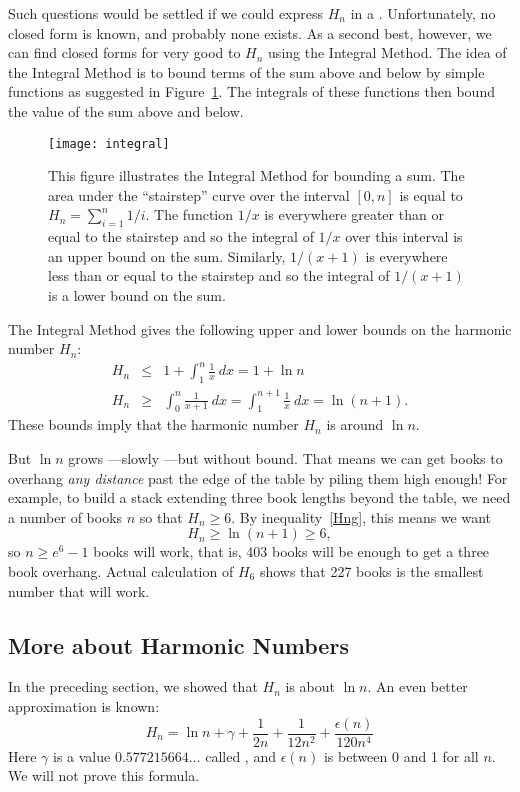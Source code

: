Such questions would be settled if we could express $H_n$ in a .  Unfortunately, no closed form is known, and probably none
exists.  As a second best, however, we can find closed forms for very good
 to $H_n$ using the Integral Method.  The idea of the
Integral Method is to bound terms of the sum above and below by simple
functions as suggested in Figure~\ref{fig:integral}.  The integrals of
these functions then bound the value of the sum above and below.

\begin{figure}[htbp]
\centerline{\texttt{[image: integral]}}
\caption{This figure illustrates the Integral Method for bounding
a sum.  The area under the ``stairstep'' curve over the interval $[0,
n]$ is equal to $H_n = \sum_{i=1}^n 1/i$.  The function $1/x$ is
everywhere greater than or equal to the stairstep and so the integral
of $1/x$ over this interval is an upper bound on the sum.  Similarly,
$1/(x+1)$ is everywhere less than or equal to the stairstep and so the
integral of $1/(x+1)$ is a lower bound on the sum.}
\label{fig:integral}
\end{figure}

The Integral Method gives the following upper and lower bounds on the
harmonic number $H_n$:
\begin{eqnarray}
H_n & \leq & 1 + \int_1^n \frac{1}{x} \ dx = 1 + \ln n \label{Hnl}\\
H_n & \geq & \int_0^n \frac{1}{x+1} \ dx = \int_1^{n+1} \frac{1}{x} \ dx = \ln(n+1).\label{Hng}
\end{eqnarray}
These bounds imply that the harmonic number $H_n$ is around $\ln n$.

But $\ln n$ grows ---slowly ---but without bound.  That means we can get
books to overhang \emph{any distance} past the edge of the table by piling
them high enough!  For example, to build a stack extending three book
lengths beyond the table, we need a number of books $n$ so that $H_n \ge
6$.  By inequality~\eqref{Hng}, this means we want
\[
H_n \geq \ln(n+1) \geq 6,
\]
so $n \geq e^6-1$ books will work, that is, 403 books will be enough to
get a three book overhang.  Actual calculation of $H_6$ shows that 227
books is the smallest number that will work.

\subsection{More about Harmonic Numbers}

In the preceding section, we showed that $H_n$ is about $\ln n$.  An
even better approximation is known:
\[
H_n = \ln n + \gamma + \frac{1}{2n} + \frac{1}{12n^2} +
        \frac{\epsilon(n)}{120n^4}
\]
Here $\gamma$ is a value $0.577215664\dots$ called , and $\epsilon(n)$ is between 0 and 1 for all $n$.  We will
not prove this formula.

